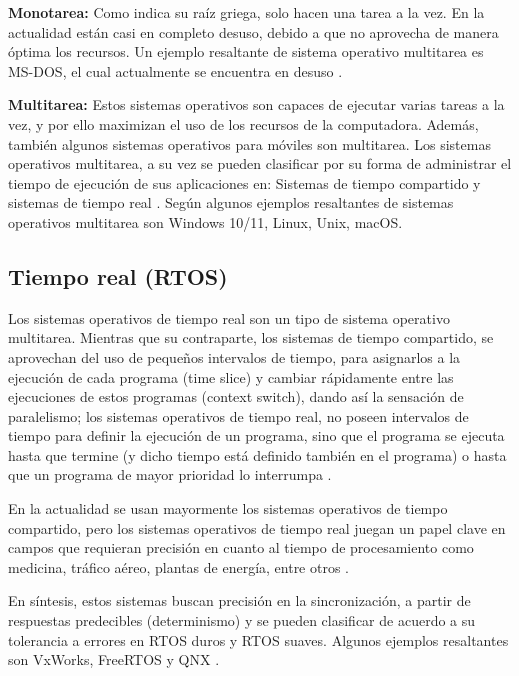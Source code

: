 \textbf{Monotarea:} Como indica su raíz griega, solo hacen una tarea a la vez. En la actualidad están casi en completo desuso, debido a que no aprovecha de manera óptima los recursos. Un ejemplo resaltante de sistema operativo multitarea es MS-DOS, el cual actualmente se encuentra en desuso \citep{olivares2021sohardware}.  

\textbf{Multitarea:} Estos sistemas operativos son capaces de ejecutar varias tareas a la vez, y por ello maximizan el uso de los recursos de la computadora. Además, también algunos sistemas operativos para móviles son multitarea. Los sistemas operativos multitarea, a su vez se pueden clasificar por su forma de administrar el tiempo de ejecución de sus aplicaciones en: Sistemas de tiempo compartido y sistemas de tiempo real \citep{olivares2021sohardware}. Según \citep{rawat2025osstudy} algunos ejemplos resaltantes de sistemas operativos multitarea son Windows 10/11, Linux, Unix, macOS.  

\subsection{Tiempo real (RTOS)}
Los sistemas operativos de tiempo real son un tipo de sistema operativo multitarea. Mientras que su contraparte, los sistemas de tiempo compartido, se aprovechan del uso de pequeños intervalos de tiempo, para asignarlos a la ejecución de cada programa (time slice) y cambiar rápidamente entre las ejecuciones de estos programas (context switch), dando así la sensación de paralelismo; los sistemas operativos de tiempo real, no poseen intervalos de tiempo para definir la ejecución de un programa, sino que el programa se ejecuta hasta que termine (y dicho tiempo está definido también en el programa) o hasta que un programa de mayor prioridad lo interrumpa \citep{olivares2021sohardware}.  

En la actualidad se usan mayormente los sistemas operativos de tiempo compartido, pero los sistemas operativos de tiempo real juegan un papel clave en campos que requieran precisión en cuanto al tiempo de procesamiento como medicina, tráfico aéreo, plantas de energía, entre otros \citep{olivares2021sohardware}.  

En síntesis, estos sistemas buscan precisión en la sincronización, a partir de respuestas predecibles (determinismo) y se pueden clasificar de acuerdo a su tolerancia a errores en RTOS duros y RTOS suaves. Algunos ejemplos resaltantes son VxWorks, FreeRTOS y QNX \citep{rawat2025osstudy}.  

